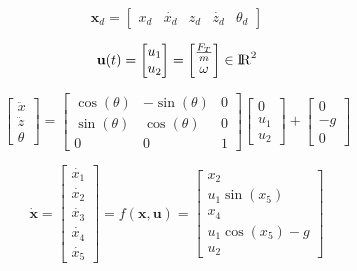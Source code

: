 \documentclass[letterpaper, 10 pt, conference]{ieeeconf}
\begin{document}
\begin{equation}
  \textbf{x}_{d} = \begin{bmatrix}
      x_{d} & \dot{x_{d}} & z_{d} & \dot{z_{d}} & \theta_{d}
  \end{bmatrix}
\end{equation}

\begin{equation}
  \textbf{u}(t)
    = \begin{bmatrix} u_{1} \\ u_{2} \end{bmatrix}
    = \begin{bmatrix} \frac{F_{T}}{m} \\ \omega \end{bmatrix}
    \in {\rm I\!R}^{2}
\end{equation}

\begin{equation}
  \begin{bmatrix}
    \ddot{x} \\
    \ddot{z} \\
    \theta
  \end{bmatrix} =
  \begin{bmatrix}
    \cos(\theta) & -\sin(\theta) & 0 \\
    \sin(\theta) & \cos(\theta) & 0 \\
    0 & 0 & 1
  \end{bmatrix}
  \begin{bmatrix} 0 \\ u_{1} \\ u_{2} \end{bmatrix} +
  \begin{bmatrix} 0 \\ -g \\ 0 \end{bmatrix}
\end{equation}

\begin{equation}
  \dot{\textbf{x}} =
    \begin{bmatrix}
      \dot{x_{1}} \\ \dot{x_{2}} \\ \dot{x_{3}} \\ \dot{x_{4}} \\ \dot{x_{5}}
    \end{bmatrix} =
    f(\textbf{x}, \textbf{u}) =
    \begin{bmatrix}
      x_{2} \\
      u_{1} \sin(x_{5}) \\
      x_{4} \\
      u_{1} \cos(x_{5}) - g \\
      u_{2}
    \end{bmatrix}
\end{equation}
\end{document}
